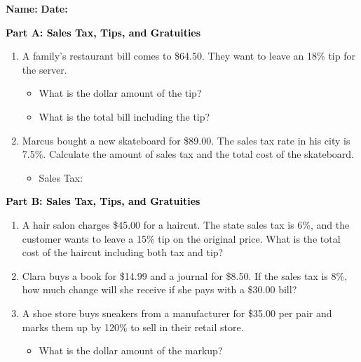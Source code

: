 \documentclass[12pt, letterpaper, fleqn]{article}
\newcommand{\blank}{\underline{\hspace{2.2cm}}}
\begin{document}
\textbf{Name:} \underline{\hspace{5cm}}
\hfill
\textbf{Date:} \underline{\hspace{3cm}}\\

\begin{tcolorbox}[colback=customteal!20]
\large\textcolor{black}{\textbf{Part A: Sales Tax, Tips, and Gratuities}}
\end{tcolorbox}

\vspace{3mm}

\begin{enumerate}[itemsep=2.5cm, leftmargin=0.6cm]
\item A family's restaurant bill comes to \$64.50. They want to leave an 18\% tip for the server. 
\begin{itemize}
\item What is the dollar amount of the tip? \blank
\item What is the total bill including the tip? \blank
\end{itemize}
\item Marcus bought a new skateboard for \$89.00. The sales tax rate in his city is 7.5\%. Calculate the amount of sales tax and the total cost of the skateboard.
\begin{itemize}
\item Sales Tax: \blank
\end{itemize}
\end{enumerate}

\newpage

\begin{tcolorbox}[colback=customteal!20]
\large\textcolor{black}{\textbf{Part B: Sales Tax, Tips, and Gratuities}}
\end{tcolorbox}

\vspace{3mm}

\begin{enumerate}[itemsep=2.5cm, leftmargin=0.6cm, resume]
\begin{itemize}
\item Total Cost: \blank
\end{itemize}
\item A hair salon charges \$45.00 for a haircut. The state sales tax is 6\%, and the customer wants to leave a 15\% tip on the original price. What is the total cost of the haircut including both tax and tip?
\item Clara buys a book for \$14.99 and a journal for \$8.50. If the sales tax is 8\%, how much change will she receive if she pays with a \$30.00 bill?
\item A shoe store buys sneakers from a manufacturer for \$35.00 per pair and marks them up by 120\% to sell in their retail store. 
\begin{itemize}
\item What is the dollar amount of the markup? \blank
\end{itemize}
\end{enumerate}
\end{document}
